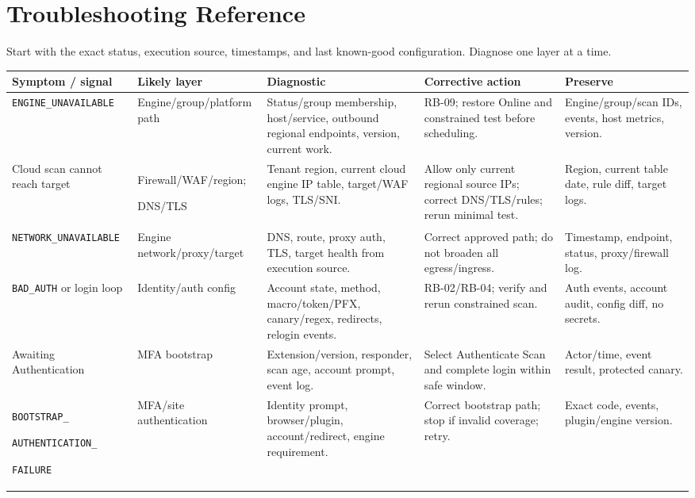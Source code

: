 \documentclass[11pt,letterpaper,oneside]{scrreprt}
\newcommand{\code}[1]{\texttt{#1}}
\newcommand{\chapterlead}[1]{\begin{tcolorbox}[enhanced,colback=R7Light,colframe=R7Light,boxrule=0pt,borderline west={3pt}{0pt}{R7Orange},arc=0pt,left=9pt,right=9pt,top=7pt,bottom=7pt]#1\end{tcolorbox}}
\begin{document}
\chapter{Troubleshooting Reference}\label{ch:troubleshooting}
\chapterlead{Start with the exact status, execution source, timestamps, and last known-good configuration. Diagnose one layer at a time.}

\begin{landscape}
\scriptsize
\begin{longtable}{@{}P{1.35in}P{1.35in}P{1.75in}P{2.10in}P{1.75in}@{}}
\toprule
\textbf{Symptom / signal} & \textbf{Likely layer} & \textbf{Diagnostic} & \textbf{Corrective action} & \textbf{Preserve}\\
\midrule
\endhead
\code{ENGINE\_\allowbreak UNAVAILABLE} & Engine/group/platform path & Status/group membership, host/service, outbound regional endpoints, version, current work. & RB-09; restore Online and constrained test before scheduling. & Engine/group/scan IDs, events, host metrics, version.\\
Cloud scan cannot reach target & Firewall/WAF/region;\par DNS/TLS & Tenant region, current cloud engine IP table, target/WAF logs, TLS/SNI. & Allow only current regional source IPs; correct DNS/TLS/rules; rerun minimal test. & Region, current table date, rule diff, target logs.\\
\code{NETWORK\_\allowbreak UNAVAILABLE} & Engine network/proxy/target & DNS, route, proxy auth, TLS, target health from execution source. & Correct approved path; do not broaden all egress/ingress. & Timestamp, endpoint, status, proxy/firewall log.\\
\code{BAD\_\allowbreak AUTH} or login loop & Identity/auth config & Account state, method, macro/token/PFX, canary/regex, redirects, relogin events. & RB-02/RB-04; verify and rerun constrained scan. & Auth events, account audit, config diff, no secrets.\\
Awaiting Authentication & MFA bootstrap & Extension/version, responder, scan age, account prompt, event log. & Select Authenticate Scan and complete login within safe window. & Actor/time, event result, protected canary.\\
\code{BOOTSTRAP\_\allowbreak }\par\code{AUTHENTICATION\_\allowbreak }\par\code{FAILURE} & MFA/site authentication & Identity prompt, browser/plugin, account/redirect, engine requirement. & Correct bootstrap path; stop if invalid coverage; retry. & Exact code, events, plugin/engine version.\\

\end{longtable}
\end{landscape}
\end{document}
